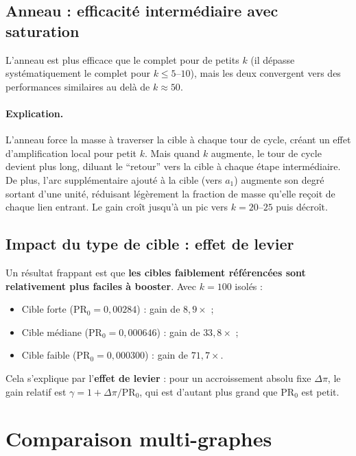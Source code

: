 \documentclass[12pt,a4paper]{article}
\newcommand{\PR}{\mathrm{PR}}
\theoremstyle{definition}
\begin{document}
\subsection{Anneau : efficacit\'{e} interm\'{e}diaire avec saturation}

L'anneau est plus efficace que le complet pour de petits $k$ (il d\'{e}passe
syst\'{e}matiquement le complet pour $k \leq 5$--$10$), mais les deux convergent
vers des performances similaires au del\`{a} de $k \approx 50$.

\paragraph{Explication.}
L'anneau force la masse \`{a} traverser la cible \`{a} chaque tour de cycle,
cr\'{e}ant un effet d'amplification local pour petit $k$. Mais quand $k$ augmente,
le tour de cycle devient plus long, diluant le ``retour'' vers la cible \`{a}
chaque \'{e}tape interm\'{e}diaire. De plus, l'arc suppl\'{e}mentaire ajout\'{e} \`{a} la
cible (vers $a_1$) augmente son degr\'{e} sortant d'une unit\'{e}, r\'{e}duisant
l\'{e}g\`{e}rement la fraction de masse qu'elle re\c{c}oit de chaque lien entrant.
Le gain cro\^{i}t jusqu'\`{a} un pic vers $k=20$--$25$ puis d\'{e}cro\^{i}t.

\subsection{Impact du type de cible : effet de levier}

Un r\'{e}sultat frappant est que \textbf{les cibles faiblement r\'{e}f\'{e}renc\'{e}es
sont relativement plus faciles \`{a} booster}. Avec $k=100$ isol\'{e}s :
\begin{itemize}[noitemsep]
  \item Cible forte ($\PR_0 = 0{,}00284$) : gain de $8{,}9\times$ ;
  \item Cible m\'{e}diane ($\PR_0 = 0{,}000646$) : gain de $33{,}8\times$ ;
  \item Cible faible ($\PR_0 = 0{,}000300$) : gain de $71{,}7\times$.
\end{itemize}

Cela s'explique par l'\textbf{effet de levier} : pour un accroissement absolu
fixe $\Delta\pi$, le gain relatif est $\gamma = 1 + \Delta\pi / \PR_0$, qui
est d'autant plus grand que $\PR_0$ est petit.

\section{Comparaison multi-graphes}
\end{document}
